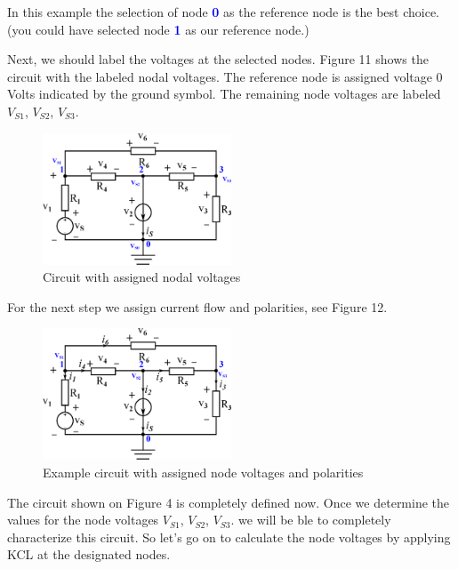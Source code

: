 \documentclass[a4 paper]{article}
\newcommand{\blue}[1]{\textcolor{blue}{#1}}
\numberwithin{equation}{section}
\newcommand{\0}{\mathbf{0}}
\begin{document}
In this example the selection of node \blue{{\bf 0}} as the reference node is the best choice. (you could have selected node \blue{{\bf 1}} as our reference node.) 

Next, we should label the voltages at the selected nodes. Figure 11 shows the circuit with the labeled nodal voltages. The reference node is assigned voltage 0 Volts indicated by the ground symbol. The remaining node voltages are labeled $V_{S1}$, $V_{S2}$, $V_{S3}$.


\begin{figure}[ht!]
  \caption{Circuit with assigned nodal voltages}
  \centering
  \includegraphics[width=0.5\textwidth]{./images/nodemethod_3}
\end{figure}


For the next step we assign current flow and polarities, see Figure 12.
\begin{figure}[ht!]
  \caption{Example circuit with assigned node voltages and polarities}
  \centering
  \includegraphics[width=0.5\textwidth]{./images/nodemethod_4}
\end{figure}
The circuit shown on Figure 4 is completely defined now. Once we determine the values for the node voltages $V_{S1}$, $V_{S2}$, $V_{S3}$. we will be ble to completely characterize this circuit. So let’s go on to calculate the node voltages by applying KCL at the designated nodes. \newline
\end{document}
